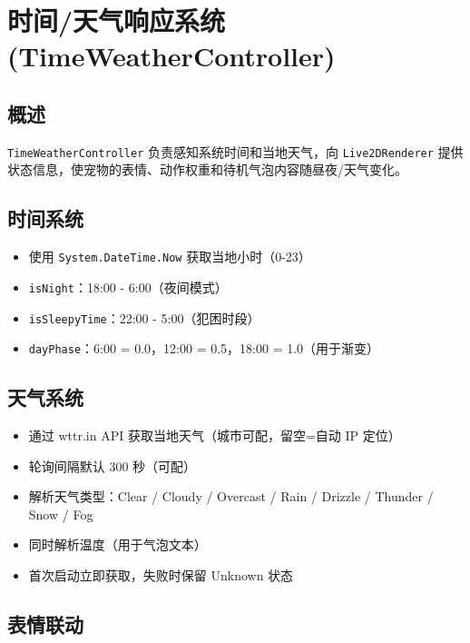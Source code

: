 \documentclass[12pt,a4paper]{ctexart}
\begin{document}
\section{时间/天气响应系统 (TimeWeatherController)}

\subsection{概述}

\texttt{TimeWeatherController} 负责感知系统时间和当地天气，向 \texttt{Live2DRenderer} 提供状态信息，使宠物的表情、动作权重和待机气泡内容随昼夜/天气变化。

\subsection{时间系统}

\begin{itemize}
    \item 使用 \texttt{System.DateTime.Now} 获取当地小时（0-23）
    \item \texttt{isNight}：18:00 - 6:00（夜间模式）
    \item \texttt{isSleepyTime}：22:00 - 5:00（犯困时段）
    \item \texttt{dayPhase}：6:00 = 0.0，12:00 = 0.5，18:00 = 1.0（用于渐变）
\end{itemize}

\subsection{天气系统}

\begin{itemize}
    \item 通过 wttr.in API 获取当地天气（城市可配，留空=自动 IP 定位）
    \item 轮询间隔默认 300 秒（可配）
    \item 解析天气类型：Clear / Cloudy / Overcast / Rain / Drizzle / Thunder / Snow / Fog
    \item 同时解析温度（用于气泡文本）
    \item 首次启动立即获取，失败时保留 Unknown 状态
\end{itemize}

\subsection{表情联动}
\end{document}
